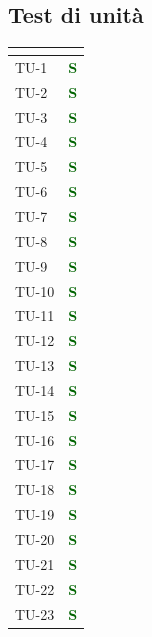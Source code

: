 \subsection{Test di unità}
\begin{longtable}{|C{2.5cm}|C{2.5cm}|}
	\hline
	\textbf{\color{title_text}{Test}} & \textbf{\color{title_text}{Stato}} \\
	\hline
	\endhead
	{TU-1} & \textcolor{darkgreen}{\textbf{S}}\\
	\hline
	{TU-2} & \textcolor{darkgreen}{\textbf{S}}\\
	\hline
	{TU-3} & \textcolor{darkgreen}{\textbf{S}}\\
	\hline
	{TU-4} & \textcolor{darkgreen}{\textbf{S}}\\
	\hline
	{TU-5} & \textcolor{darkgreen}{\textbf{S}}\\
	\hline
	{TU-6} & \textcolor{darkgreen}{\textbf{S}}\\
	\hline
	{TU-7} & \textcolor{darkgreen}{\textbf{S}}\\
	\hline
	{TU-8} & \textcolor{darkgreen}{\textbf{S}}\\
	\hline
	{TU-9} & \textcolor{darkgreen}{\textbf{S}}\\
	\hline
	{TU-10} & \textcolor{darkgreen}{\textbf{S}}\\
	\hline
	{TU-11} & \textcolor{darkgreen}{\textbf{S}}\\
	\hline
	{TU-12} & \textcolor{darkgreen}{\textbf{S}}\\
	\hline
	{TU-13} & \textcolor{darkgreen}{\textbf{S}}\\
	\hline
	{TU-14} & \textcolor{darkgreen}{\textbf{S}}\\
	\hline
	{TU-15} & \textcolor{darkgreen}{\textbf{S}}\\
	\hline
	{TU-16} & \textcolor{darkgreen}{\textbf{S}}\\
	\hline
	{TU-17} & \textcolor{darkgreen}{\textbf{S}}\\
	\hline
	{TU-18} & \textcolor{darkgreen}{\textbf{S}}\\
	\hline
	{TU-19} & \textcolor{darkgreen}{\textbf{S}}\\
	\hline
	{TU-20} & \textcolor{darkgreen}{\textbf{S}}\\
	\hline
	{TU-21} & \textcolor{darkgreen}{\textbf{S}}\\
	\hline
	{TU-22} & \textcolor{darkgreen}{\textbf{S}}\\
	\hline
	{TU-23} & \textcolor{darkgreen}{\textbf{S}}\\
	\hline

\end{longtable}
